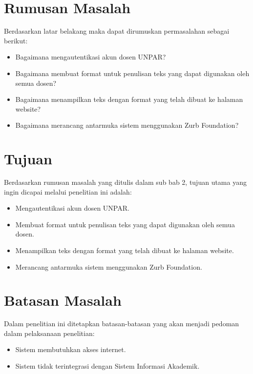 \section{Rumusan Masalah}
Berdasarkan latar belakang maka dapat dirumuskan permasalahan sebagai berikut:
\begin{itemize}
	\item Bagaimana mengautentikasi akun dosen UNPAR?
	\item Bagaimana membuat format untuk penulisan teks yang dapat digunakan oleh semua dosen?
	\item Bagaimana menampilkan teks dengan format yang telah dibuat ke halaman website?
	\item Bagaimana merancang antarmuka sistem menggunakan Zurb Foundation?
\end{itemize}

\section{Tujuan}
Berdasarkan rumusan masalah yang ditulis dalam sub bab 2, tujuan utama yang
ingin dicapai melalui penelitian ini adalah:
\begin{itemize}
	\item Mengautentikasi akun dosen UNPAR.
	\item Membuat format untuk penulisan teks yang dapat digunakan oleh semua dosen.
	\item Menampilkan teks dengan format yang telah dibuat ke halaman website.
	\item Merancang antarmuka sistem menggunakan Zurb Foundation.
\end{itemize}

\section{Batasan Masalah}
Dalam penelitian ini ditetapkan batasan-batasan yang akan menjadi pedoman dalam
pelaksanaan penelitian:
\begin{itemize}
    \item Sistem membutuhkan akses internet.
	\item Sistem tidak terintegrasi dengan Sistem Informasi Akademik.
\end{itemize}

